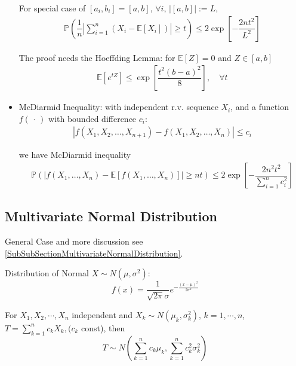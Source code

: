 \begin{itemize}
    For special case of $ [a_i,b_i]=[a,b] $, $ \forall i $, $ |[a,b]|:=L $,
    \begin{align*}
        \mathbb{P}\left( \dfrac{1}{n}\left\vert \sum_{i=1}^n\left(X_i-\mathbb{E}\left[ X_i \right] \right)  \right\vert \geq t   \right)  \leq 2\exp\left[ -\dfrac{2nt^2}{L^2} \right]
    \end{align*}
    
    

    The proof needs the Hoeffding Lemma: for $ \mathbb{E}\left[ Z \right]=0  $ and $ Z\in[a,b] $
    \begin{align}
        \mathbb{E}\left[ e^{tZ} \right]\leq \exp\left[ \dfrac{t^2(b-a)^2}{8} \right],\quad \forall t  
    \end{align}
    
    \item McDiarmid Inequality: with independent r.v. sequence $ X_i $, and a function $ f(\, \cdot \, ) $ with bounded difference $ c_i $:
    \begin{align*}
        \left| f\left(X_1,X_2,\ldots,X_{n+1}\right)- f\left(X_1,X_2,\ldots,X_{n}\right) \right| \leq c_i
    \end{align*}

    we have McDiarmid inequality
    \begin{align*}
        \mathbb{P}\left( \left| f(X_1,\ldots,X_n)-\mathbb{E}\left[ f(X_1,\ldots,X_n) \right]  \right| \geq nt\right) \leq 2\exp\left[ -\dfrac{2n^2t^2}{\sum_{i=1}^nc_i^2} \right] 
    \end{align*}
    
\end{itemize}


\subsection{Multivariate Normal Distribution}\label{SubsectionDerivationMultivariateNormal}
    General Case and more discussion see \autoref{SubSubSectionMultivariateNormalDistribution}.

    Distribution of Normal $ X\sim N(\mu ,\sigma ^2) $:
    \[
        f(x)=\dfrac{1}{\sqrt{2\pi}\sigma }e^{-\frac{(x-\mu )^2}{2\sigma ^2}} 
    \]
    
    

    For $X_1,X_2,\cdots,X_n$ independent and $X_k\sim N(\mu_k,\sigma^2_k),\, k=1,\cdots,n$, $T={\displaystyle\sum_{k=1}^n c_kX_k}, (c_k$ const), then
    \begin{equation}
        T\sim N(\sum_{k=1}^nc_k\mu_k,\sum_{k=1}^n c_k^2\sigma^2_k)    
    \end{equation}

